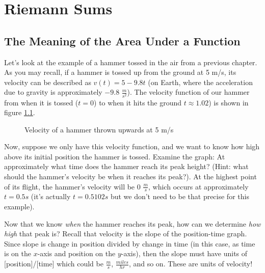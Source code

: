 \chapter{Riemann Sums}
\section{The Meaning of the Area Under a Function}

Let's look at the example of a hammer tossed in the air from a previous chapter. As you may recall, if a hammer is tossed up from the ground at 5 m/s, its velocity can be described as $v(t) = 5-9.8t$ (on Earth, where the acceleration due to gravity is approximately $-9.8$ $\frac{m}{s^2}$). The velocity function of our hammer from when it is tossed ($t=0$) to when it hits the ground $t\approx1.02$) is shown in figure \ref{fig:hammer}.

\begin{figure}[htbp]
	\centering
	\caption{Velocity of a hammer thrown upwards at 5 m/s}
	\label{fig:hammer}
\end{figure}

Now, suppose we only have this velocity function, and we want to know how high above its initial position the hammer is tossed. Examine the graph: At approximately what time does the hammer reach its peak height? (Hint: what should the hammer's velocity be when it reaches its peak?). At the highest point of its flight, the hammer's velocity will be $0$ $\frac{m}{s}$, which occurs at approximately $t=0.5s$ (it's actually $t=0.5102s$ but we don't need to be that precise for this example). 

Now that we know \textit{when} the hammer reaches its peak, how can we determine \textit{how high} that peak is? Recall that velocity is the slope of the position-time graph. Since slope is change in position divided by change in time (in this case, as time is on the $x$-axis and position on the $y$-axis), then the slope must have units of [position]/[time] which could be $\frac{m}{s}$, $\frac{miles}{hr}$, and so on. These are units of velocity! 

